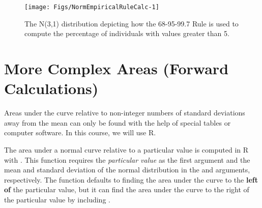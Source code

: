 \documentclass[10pt,openany]{book}\usepackage[]{graphicx}\usepackage[]{color}
\newenvironment{knitrout}{}{} %
\begin{document}
\begin{knitrout}
\color{fgcolor}\begin{figure}[hbtp]

{\centering \texttt{[image: Figs/NormEmpiricalRuleCalc-1]} 

}

\caption[The N(3,1) distribution depicting how the 68-95-99.7 Rule is used to compute the percentage of individuals with values greater than 5]{The N(3,1) distribution depicting how the 68-95-99.7 Rule is used to compute the percentage of individuals with values greater than 5.}\label{fig:NormEmpiricalRuleCalc}
\end{figure}


\end{knitrout}



\section[Forward Calculations]{More Complex Areas (Forward Calculations)}
Areas under the curve relative to non-integer numbers of standard deviations away from the mean can only be found with the help of special tables or computer software. In this course, we will use R.

The area under a normal curve relative to a particular value is computed in R with . This function requires the \textit{particular value} as the first argument and the mean and standard deviation of the normal distribution in the  and  arguments, respectively. The  function defaults to finding the area under the curve to the \textbf{left of} the particular value, but it can find the area under the curve to the right of the particular value by including .
\end{document}

